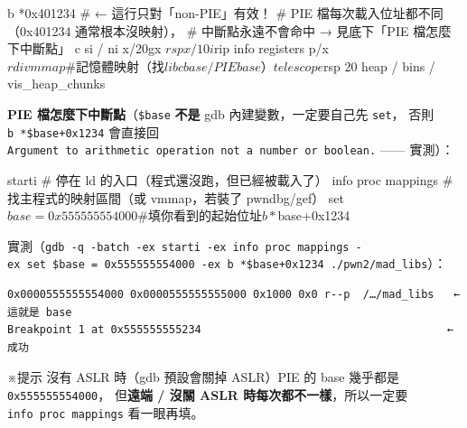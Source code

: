 \documentclass[10pt,a4paper]{article}
\newenvironment{Shaded}{\begin{snugshade}}{\end{snugshade}}
\newcommand{\NormalTok}[1]{#1}
\renewenvironment{Shaded}{%
  \def\FrameCommand{\fboxsep=3.2pt\colorbox{shadecolor}}%
  \MakeFramed{\advance\hsize-\width\FrameRestore\small}%
}{%
  \endMakeFramed
}
\renewenvironment{quote}{%
  \begin{mdframed}[linewidth=0pt,innerleftmargin=0pt,innerrightmargin=0pt,
    innerbottommargin=0pt,innertopmargin=0pt,skipabove=0.55em,skipbelow=0.55em,
    leftmargin=0.9em,rightmargin=0.4em,startcode={\color{quotebar}\vrule width 2.6pt},%
    endcode={}]%
  \itshape\color{black}%
}{%
  \end{mdframed}%
}
\begin{document}
\begin{Shaded}
\begin{Highlighting}[]
\NormalTok{b *0x401234                \# ← 這行只對「non{-}PIE」有效！}
\NormalTok{                           \#   PIE 檔每次載入位址都不同（0x401234 通常根本沒映射），}
\NormalTok{                           \#   中斷點永遠不會命中 → 見底下「PIE 檔怎麼下中斷點」}
\NormalTok{c}
\NormalTok{si / ni}
\NormalTok{x/20gx $rsp}
\NormalTok{x/10i $rip}
\NormalTok{info registers}
\NormalTok{p/x $rdi}
\NormalTok{vmmap                     \# 記憶體映射（找 libc base / PIE base）}
\NormalTok{telescope $rsp 20}
\NormalTok{heap / bins / vis\_heap\_chunks}
\end{Highlighting}
\end{Shaded}

\begin{quote}
\textbf{PIE 檔怎麼下中斷點}（\texttt{\$\allowbreak{}base} \textbf{不是} gdb
內建變數，一定要自己先 \texttt{set}， 否則 \texttt{b\ \allowbreak{}*\$\allowbreak{}base+0x1234}
會直接回
\texttt{Argument\ \allowbreak{}to\ \allowbreak{}arithmetic\ \allowbreak{}operation\ \allowbreak{}not\ \allowbreak{}a\ \allowbreak{}number\ \allowbreak{}or\ \allowbreak{}boolean.}
------ 實測）：

\begin{Shaded}
\begin{Highlighting}[]
\NormalTok{starti                      \# 停在 ld 的入口（程式還沒跑，但已經被載入了）}
\NormalTok{info proc mappings          \# 找主程式的映射區間（或 vmmap，若裝了 pwndbg/gef）}
\NormalTok{set $base = 0x555555554000  \# 填你看到的起始位址}
\NormalTok{b *$base+0x1234}
\end{Highlighting}
\end{Shaded}

實測（\texttt{gdb\ \allowbreak{}-\allowbreak{}q\ \allowbreak{}-\allowbreak{}batch\ \allowbreak{}-\allowbreak{}ex\ \allowbreak{}starti\ \allowbreak{}-\allowbreak{}ex\ \allowbreak{}\textquotesingle{}\allowbreak{}info\ \allowbreak{}proc\ \allowbreak{}mappings\textquotesingle{}\allowbreak{}\ \allowbreak{}-\allowbreak{}ex\ \allowbreak{}\textquotesingle{}\allowbreak{}set\ \allowbreak{}\$\allowbreak{}base\ \allowbreak{}=\ \allowbreak{}0x555555554000\textquotesingle{}\allowbreak{}\ \allowbreak{}-\allowbreak{}ex\ \allowbreak{}\textquotesingle{}\allowbreak{}b\ \allowbreak{}*\$\allowbreak{}base+0x1234\textquotesingle{}\allowbreak{}\ \allowbreak{}./\allowbreak{}pwn2/\allowbreak{}mad\_\allowbreak{}libs}）：

\begin{Verbatim}[breaklines=true,breakanywhere=true,breakautoindent=false,fontsize=\fontsize{7.0}{9.5}\selectfont]
0x0000555555554000 0x0000555555555000 0x1000 0x0 r--p  /…/mad_libs   ← 這就是 base
Breakpoint 1 at 0x555555555234                                      ← 成功
\end{Verbatim}

※提示 沒有 ASLR 時（gdb 預設會關掉 ASLR）PIE 的 base 幾乎都是
\texttt{0x555555554000}， 但\textbf{遠端 / 沒關 ASLR
時每次都不一樣}，所以一定要 \texttt{info\ \allowbreak{}proc\ \allowbreak{}mappings} 看一眼再填。
\end{quote}
\end{document}

